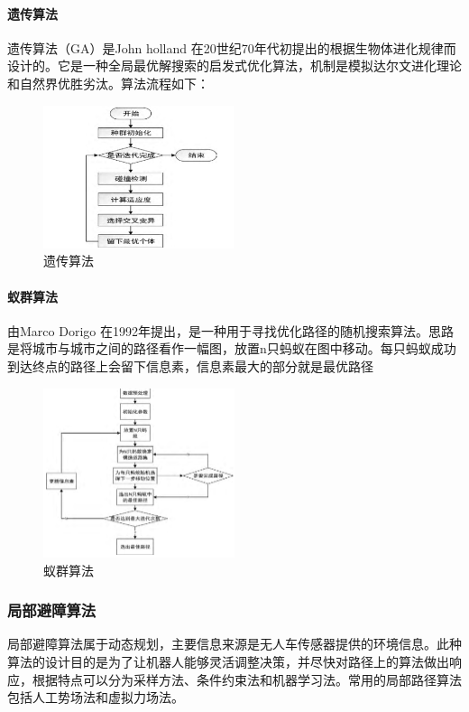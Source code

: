 \documentclass{report}
\begin{document}
\paragraph{遗传算法}

遗传算法（GA）是John holland 在20世纪70年代初提出的根据生物体进化规律而设计的\cite{jh5}。它是一种全局最优解搜索的启发式优化算法，机制是模拟达尔文进化理论和自然界优胜劣汰。算法流程如下：
\begin{figure}[ht]
  \centering
  \includegraphics[width=0.5\textwidth]{figures/yichuan.png}
  \caption{遗传算法}
\end{figure}

\paragraph{蚁群算法}

由Marco Dorigo 在1992年提出，是一种用于寻找优化路径的随机搜索算法\cite{jh5}。思路是将城市与城市之间的路径看作一幅图，放置n只蚂蚁在图中移动。每只蚂蚁成功到达终点的路径上会留下信息素，信息素最大的部分就是最优路径
\begin{figure}[ht]
  \centering
  \includegraphics[width=0.5\textwidth]{figures/yiqun.png}
  \caption{蚁群算法 }
\end{figure}
\newpage
\subsubsection{局部避障算法}
\label{subsec:label}
局部避障算法属于动态规划，主要信息来源是无人车传感器提供的环境信息。此种算法的设计目的是为了让机器人能够灵活调整决策，并尽快对路径上的算法做出响应，根据特点可以分为采样方法、条件约束法和机器学习法。常用的局部路径算法包括人工势场法和虚拟力场法。
\end{document}

